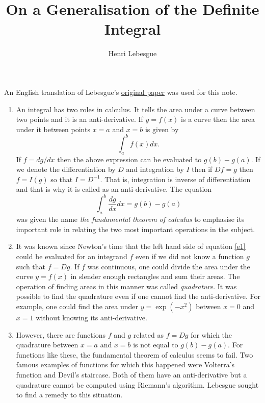 \documentclass{article}
\theoremstyle{plain}
\numberwithin{thm}{section}
\theoremstyle{plain}
\numberwithin{prop}{section}
\theoremstyle{definition}
\numberwithin{defn}{section}
\theoremstyle{remark}
\begin{document}
\title{On a Generalisation of the Definite Integral}
\author{Henri Lebesgue}
\maketitle

An English translation of Lebesgue's 
\href{https://fermatslibrary.com/s/on-a-generalization-of-the-definite-integral}
{original paper} was used for this note.

\begin{enumerate}
\item An integral has two roles in calculus. It tells the area under a curve
between two points and it is an anti-derivative. If $y = f(x)$ is a curve then
the area under it between points $x = a$ and $x = b$ is given by
\[
\int_a^b f(x)dx.
\]
If $f = dg/dx$ then the above expression can be evaluated to $g(b) - g(a)$.
If we denote the differentiation by $D$ and integration by $I$ then if $Df = g$
then $f = I(g)$ so that $I = D^{-1}$. That is, integration is inverse of
differentiation and that is why it is called as an anti-derivative. The
equation
\begin{equation}\label{e1}
\int_a^b \frac{dg}{dx}dx = g(b) - g(a)
\end{equation}
was given the name \emph{the fundamental theorem of calculus} to emphasise its
important role in relating the two most important operations in the subject.

\item It was known since Newton's time that the left hand side of equation 
\eqref{e1} could be evaluated for an integrand $f$ even if we did not know a
function $g$ such that $f = Dg$. If $f$ was continuous, one could divide the
area under the curve $y = f(x)$ in slender enough rectangles and sum their 
areas. The operation of finding areas in this manner was called 
\emph{quadrature}. It was possible to find the quadrature even if one cannot
find the anti-derivative. For example, one could find the area under $y = 
\exp(-x^2)$ between $x = 0$ and $x = 1$ without knowing its anti-derivative.

\item However, there are functions $f$ and $g$ related as $f = Dg$ for which
the quadrature between $x=a$ and $x=b$ is not equal to $g(b) - g(a)$. For
functions like these, the fundamental theorem of calculus seems to fail. Two 
famous examples of functions for which this happened were Volterra's function
and Devil's staircase. Both of them have an anti-derivative but a quadrature
cannot be computed using Riemann's algorithm. Lebesgue sought to find a remedy
to this situation.


\end{enumerate}
\end{document}
